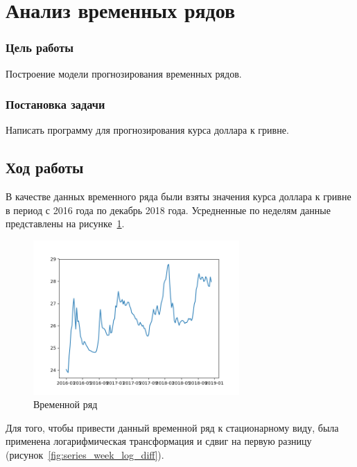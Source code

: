 



\newcommand{\labnumber}{6}



\graphicspath{{figures/}}


\Russian


\addtocounter{page}{1}

\section*{Анализ временных рядов}
\subsubsection*{Цель работы}
Построение модели прогнозирования временных рядов. 
\subsubsection*{Постановка задачи}
Написать программу для прогнозирования курса доллара к гривне.

\subsection*{Ход работы}
В качестве данных временного ряда были взяты значения курса доллара к гривне в период с 2016 года по декабрь 2018 года.
Усредненные по неделям данные представлены на рисунке~\ref{fig:series_week}.

\begin{figure}[H]
    \centering
        \includegraphics[width=0.7\textwidth]{series_week}
    \caption{Временной ряд}
    \label{fig:series_week}
\end{figure}

Для того, чтобы привести данный временной ряд к стационарному виду, была применена логарифмическая трансформация и сдвиг на первую разницу (рисунок~\ref{fig:series_week_log_diff}).

